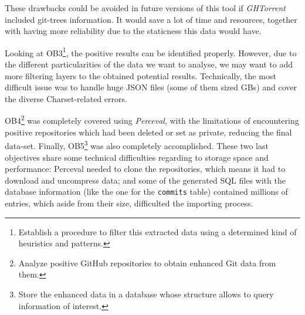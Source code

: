 \documentclass[a4paper, 12pt]{book}
\begin{document}
These drawbacks could be avoided in future versions of this tool if \emph{GHTorrent} included git-trees information. It would save a lot of time and resources,
together with having more reliability due to the staticness this data would have.\par
Looking at OB3\footnote{Establish a procedure to filter this extracted data using a determined kind of heuristics and patterns.},
the positive results can be identified properly. However, due to the different particularities of the data
we want to analyse, we may want to add more filtering layers to the obtained potential results. Technically,
the most difficult issue was to handle huge JSON files (some of them sized GBs) and cover the diverse Charset-related
errors.\par
OB4\footnote{Analyze positive GitHub repositories to obtain enhanced Git data from them.}
was completely covered using \emph{Perceval}, with the limitations of encountering positive repositories which had been deleted
or set as private, reducing the final data-set.
Finally, OB5\footnote{Store the enhanced data in a database whose structure allows to query information of interest.}
was also completely accomplished. These two last objectives
share some technical difficulties regarding to storage space and performance: Perceval needed to clone the repositories,
which means it had to download and uncompress data; and some of the generated SQL files with the database information
(like the one for the \texttt{commits} table) contained millions of entries, which aside from their size, difficulted
the importing process.\par
\end{document}
